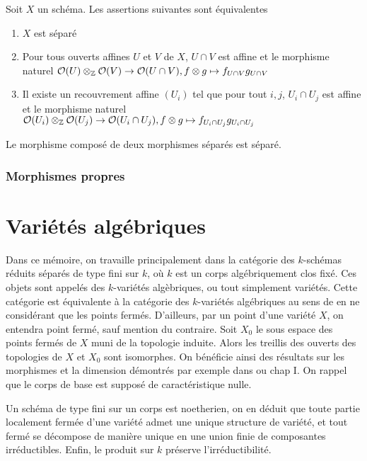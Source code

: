 \begin{prop}\label{sepCritere}
Soit $X$ un schéma. Les assertions suivantes sont équivalentes
	\begin{enumerate}
	\item $X$ est séparé
	\item Pour tous ouverts affines $U$ et $V$ de $X$, $U\cap V$ est affine et le morphisme naturel $\mathcal{O}(U)\otimes_{\mathbb{Z}} \mathcal{O}(V)\rightarrow\mathcal{O}(U\cap V), f\otimes g\mapsto f_{U\cap V}g_{U\cap V}$
	\item Il existe un recouvrement affine $(U_i)$ tel que pour tout $i,j$, $U_i\cap U_j$ est affine et le morphisme naturel $\mathcal{O}(U_i)\otimes_{\mathbb{Z}} \mathcal{O}(U_j)\rightarrow\mathcal{O}(U_i\cap U_j), f\otimes g\mapsto f_{U_i\cap U_j}g_{U_i\cap U_j}$
	\end{enumerate}
\end{prop}

\begin{prop}\label{sepCritere2}
Le morphisme composé de deux morphismes séparés est séparé.
\end{prop}


\subsubsection{Morphismes propres}


\section{Variétés algébriques}

Dans ce mémoire, on travaille principalement dans la catégorie des $k$-schémas réduits séparés de type fini sur $k$, où $k$ est un corps algébriquement clos fixé. Ces objets sont appelés des $k$-variétés algèbriques, ou tout simplement variétés.  Cette catégorie est équivalente à la catégorie des $k$-variétés algébriques au sens de \cite{LAGSpringer} en ne considérant que les points fermés. D'ailleurs, par un point d'une variété $X$, on entendra point fermé, sauf mention du contraire. Soit $X_0$ le sous espace des points fermés de $X$ muni de la topologie induite. Alors les treillis des ouverts des topologies de $X$ et $X_0$ sont isomorphes. On bénéficie ainsi des résultats sur les morphismes et la dimension démontrés par exemple dans \cite{LAGSpringer} ou \cite{MumfordRedBook} chap I. On rappel que le corps de base est supposé de caractéristique nulle.

Un schéma de type fini sur un corps est noetherien, on en déduit que toute partie localement fermée d'une variété admet une unique structure de variété, et tout fermé se décompose de manière unique en une union finie de composantes irréductibles. Enfin, le produit sur $k$ préserve l'irréductibilité.

